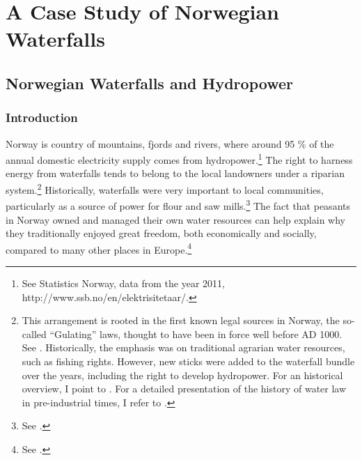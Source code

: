 \part{A Case Study of Norwegian Waterfalls}

\chapter{Norwegian Waterfalls and Hydropower}\label{chap:3}

\section{Introduction}\label{sec:into3}

Norway is country of mountains, fjords and rivers, where around 95 \% of the annual domestic electricity supply comes from hydropower.\footnote{See Statistics Norway, data from the year 2011, http://www.ssb.no/en/elektrisitetaar/.} The right to harness energy from waterfalls tends to belong to the local landowners under a riparian system.\footnote{This arrangement is rooted in the first known legal sources in Norway, the so-called ``Gulating'' laws, thought to have been in force well before AD 1000. See \cite[111-112,120]{robberstad81}. Historically, the emphasis was on traditional agrarian water resources, such as fishing rights. However, new sticks were added to the waterfall bundle over the years, including the right to develop hydropower. For an historical overview, I point to \cite[14-32]{vislie44}. For a detailed presentation of the history of water law in pre-industrial times, I refer to \cite{motzfeld08}. } Historically, waterfalls were very important to local communities, particularly as a source of power for flour and saw mills.\footnote{See \cite[121]{tvedt13}.} The fact that peasants in Norway owned and managed their own water resources can help explain why they traditionally enjoyed great freedom, both economically and socially, compared to many other places in Europe.\footnote{See \cite[121]{tvedt13}.}


